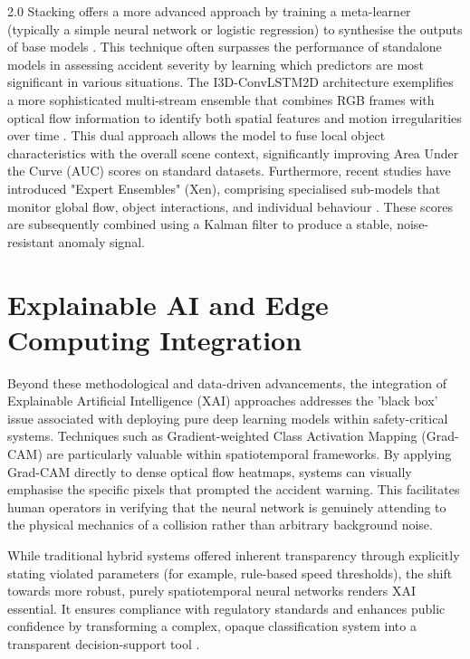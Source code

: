 \begin{spacing}{2.0}
Stacking offers a more advanced approach by training a meta-learner (typically a simple neural network or logistic regression) to synthesise the outputs of base models \cite{liu_hybrid_2025}. This technique often surpasses the performance of standalone models in assessing accident severity by learning which predictors are most significant in various situations. The I3D-ConvLSTM2D architecture exemplifies a more sophisticated multi-stream ensemble that combines RGB frames with optical flow information to identify both spatial features and motion irregularities over time \cite{adewopo_smart_2023}. This dual approach allows the model to fuse local object characteristics with the overall scene context, significantly improving Area Under the Curve (AUC) scores on standard datasets. Furthermore, recent studies have introduced "Expert Ensembles" (Xen), comprising specialised sub-models that monitor global flow, object interactions, and individual behaviour \cite{orlova_simplifying_2025}. These scores are subsequently combined using a Kalman filter to produce a stable, noise-resistant anomaly signal.

\section{Explainable AI and Edge Computing Integration}
Beyond these methodological and data-driven advancements, the integration of Explainable Artificial Intelligence (XAI) approaches addresses the 'black box' issue associated with deploying pure deep learning models within safety-critical systems. Techniques such as Gradient-weighted Class Activation Mapping (Grad-CAM) are particularly valuable within spatiotemporal frameworks. By applying Grad-CAM directly to dense optical flow heatmaps, systems can visually emphasise the specific pixels that prompted the accident warning. This facilitates human operators in verifying that the neural network is genuinely attending to the physical mechanics of a collision rather than arbitrary background noise.

While traditional hybrid systems offered inherent transparency through explicitly stating violated parameters (for example, rule-based speed thresholds), the shift towards more robust, purely spatiotemporal neural networks renders XAI essential. It ensures compliance with regulatory standards and enhances public confidence by transforming a complex, opaque classification system into a transparent decision-support tool \cite{pandey_explainable_2026}.


\end{spacing}
